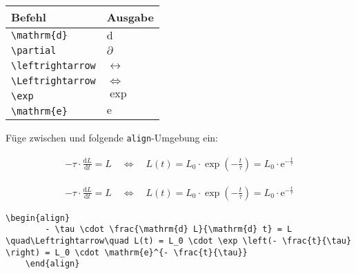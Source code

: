 \begin{frame}[fragile]
	\begin{center}
		\begin{tabular}{ll}
			\toprule
			Befehl							&	Ausgabe					\\ \midrule
			\lstinline|\mathrm{d}|		&	$\mathrm{d}$		\\
			\lstinline|\partial|		&	$\partial$		
			\\
			\lstinline|\leftrightarrow|		&	$\leftrightarrow$		
      \\
			\lstinline|\Leftrightarrow|		&	$\Leftrightarrow$		
			\\
			\lstinline|\exp|					&	$\exp$		\\
      \lstinline|\mathrm{e}|		& $\mathrm{e}$		\\
			\bottomrule
		\end{tabular}
	\end{center}
	\pause\btVFill
	\Aufgabee
	Füge zwischen \qquote{$\tau$} und  folgende \lstinline[basicstyle=\normalfont\normalsize]|align|-Umgebung ein:
	\begin{outputbox}
	    \begin{align}
	      - \tau \cdot \frac{\mathrm{d} L}{\mathrm{d} t} = L \quad\Leftrightarrow\quad L(t) = L_0 \cdot \exp \left(- \frac{t}{\tau} \right) = L_0 \cdot \mathrm{e}^{- \frac{t}{\tau}}
	    \end{align}	
    \end{outputbox}
	\vspace{0.3cm}
\end{frame}
\begin{frame}[fragile]
	\Losung
	\begin{outputbox}
	    \begin{align}
	        - \tau \cdot \frac{\mathrm{d} L}{\mathrm{d} t} = L \quad\Leftrightarrow\quad L(t) = L_0 \cdot \exp \left(- \frac{t}{\tau} \right) = L_0 \cdot \mathrm{e}^{- \frac{t}{\tau}}
	    \end{align}
	\end{outputbox}

	\Code
	\begin{lstlisting}[gobble=4]
    \begin{align}
        - \tau \cdot \frac{\mathrm{d} L}{\mathrm{d} t} = L \quad\Leftrightarrow\quad L(t) = L_0 \cdot \exp \left(- \frac{t}{\tau} \right) = L_0 \cdot \mathrm{e}^{- \frac{t}{\tau}}
    \end{align}
	\end{lstlisting}
\end{frame}

